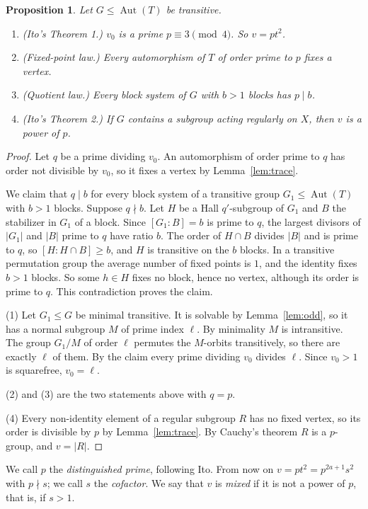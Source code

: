 \documentclass[11pt]{amsart}
\newtheorem{proposition}[theorem]{Proposition}
\theoremstyle{definition}
\theoremstyle{remark}
\newcommand{\Aut}{\operatorname{Aut}}
\begin{document}
\begin{proposition}\label{prop:laws}
Let $G\le\Aut(T)$ be transitive.
\begin{enumerate}
\item\emph{(Ito's Theorem 1.)} $v_0$ is a prime $p\equiv3\pmod4$. So $v=pt^2$.
\item\emph{(Fixed-point law.)} Every automorphism of $T$ of order prime to $p$ fixes a vertex.
\item\emph{(Quotient law.)} Every block system of $G$ with $b>1$ blocks has $p\mid b$.
\item\emph{(Ito's Theorem 2.)} If $G$ contains a subgroup acting regularly on $X$, then $v$ is a power of $p$.
\end{enumerate}
\end{proposition}
\begin{proof}
Let $q$ be a prime dividing $v_0$. An automorphism of order prime to $q$ has order not divisible by $v_0$, so it fixes a vertex by Lemma~\ref{lem:trace}.

We claim that $q\mid b$ for every block system of a transitive group $G_1\le\Aut(T)$ with $b>1$ blocks. Suppose $q\nmid b$. Let $H$ be a Hall $q'$-subgroup of $G_1$ and $B$ the stabilizer in $G_1$ of a block. Since $[G_1:B]=b$ is prime to $q$, the largest divisors of $|G_1|$ and $|B|$ prime to $q$ have ratio $b$. The order of $H\cap B$ divides $|B|$ and is prime to $q$, so $[H:H\cap B]\ge b$, and $H$ is transitive on the $b$ blocks. In a transitive permutation group the average number of fixed points is $1$, and the identity fixes $b>1$ blocks. So some $h\in H$ fixes no block, hence no vertex, although its order is prime to $q$. This contradiction proves the claim.

(1) Let $G_1\le G$ be minimal transitive. It is solvable by Lemma~\ref{lem:odd}, so it has a normal subgroup $M$ of prime index $\ell$. By minimality $M$ is intransitive. The group $G_1/M$ of order $\ell$ permutes the $M$-orbits transitively, so there are exactly $\ell$ of them. By the claim every prime dividing $v_0$ divides $\ell$. Since $v_0>1$ is squarefree, $v_0=\ell$.

(2) and (3) are the two statements above with $q=p$.

(4) Every non-identity element of a regular subgroup $R$ has no fixed vertex, so its order is divisible by $p$ by Lemma~\ref{lem:trace}. By Cauchy's theorem $R$ is a $p$-group, and $v=|R|$.
\end{proof}

We call $p$ the \emph{distinguished prime}, following Ito. From now on $v=pt^2=p^{2a+1}s^2$ with $p\nmid s$; we call $s$ the \emph{cofactor}. We say that $v$ is \emph{mixed} if it is not a power of $p$, that is, if $s>1$.
\end{document}
